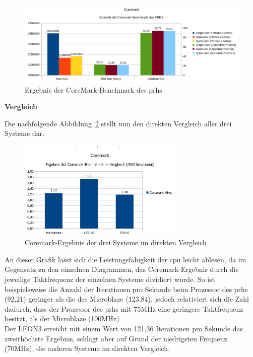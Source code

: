 \begin{figure}[H]
\centering
\includegraphics[width=1.1\textwidth]{Hauptteil/coremarkprhs.png}
\caption{Ergebnis der CoreMark-Benchmark des \ac{prhs}}
\label{fig:coremarkprhs}
\end{figure}

\newpage
\textbf{Vergleich}

Die nachfolgende Abbildung~\ref{fig:coremarkresult} stellt nun den direkten Vergleich aller drei Systeme dar.\\

\begin{figure}[H]
\centering
\includegraphics[width=0.7\textwidth]{Hauptteil/coremarkresult.png}
\caption{Coremark-Ergebnis der drei Systeme im direkten Vergleich}
\label{fig:coremarkresult}
\end{figure}

An dieser Grafik lässt sich die Leistungsfähigkeit der \ac{cpu} leicht ablesen, da im Gegensatz zu den einzelnen Diagrammen, das Coremark-Ergebnis durch die jeweilige Taktfrequenz der
einzelnen Systeme dividiert wurde. So ist beispielsweise die Anzahl der Iterationen pro Sekunde beim Prozessor des \ac{prhs} (92,21) geringer als die des Microblaze (123,84), jedoch
relativiert sich die Zahl dadurch, dass der Prozessor des \ac{prhs} mit 75MHz eine geringere Taktfrequenz besitzt, als der Microblaze (100MHz). \\
Der LEON3 erreicht mit einem Wert von 121,36 Iterationen pro Sekunde das zweithöchste Ergebnis, schlägt aber auf Grund der niedrigsten Frequenz (70MHz), die anderen Systeme im direkten Vergleich.\\

